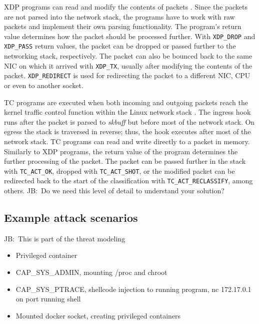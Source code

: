 \documentclass[english, 12pt, a4paper, sci, utf8, a-2b, online]{aaltothesis}
\newcommand{\mycomment}[3]{\textcolor{#1}{#2:~#3}}
\newcommand{\jb}[1]{\noindent\mycomment{aaltoRed}{JB}{#1}}
\begin{document}

XDP programs can read and modify the contents of packets \cite{vieira2020fast}.
Since the packets are not parsed into the network stack, the programs have to work with raw packets and implement their own parsing functionality.
The program's return value determines how the packet should be processed further.
With \texttt{XDP\_DROP} and \texttt{XDP\_PASS} return values, the packet can be dropped or passed further to the networking stack, respectively.
The packet can also be bounced back to the same NIC on which it arrived with \texttt{XDP\_TX}, usually after modifying the contents of the packet.
\texttt{XDP\_REDIRECT} is used for redirecting the packet to a different NIC, CPU or even to another socket.

TC programs are executed when both incoming and outgoing packets reach the kernel traffic control function within the Linux network stack \cite{vieira2020fast}.
The ingress hook runs after the packet is parsed to \emph{skbuff} but before most of the network stack.
On egress the stack is traversed in reverse; thus, the hook executes after most of the network stack.
TC programs can read and write directly to a packet in memory.
Similarly to XDP programs, the return value of the program determines the further processing of the packet.
The packet can be passed further in the stack with \texttt{TC\_ACT\_OK}, dropped with \texttt{TC\_ACT\_SHOT}, or the modified packet can be redirected back to the start of the classification with \texttt{TC\_ACT\_RECLASSIFY}, among others.
\jb{Do we need this level of detail to understand your solution?}

\clearpage
\subsection{Example attack scenarios}
\jb{This is part of the threat modeling}

\begin{itemize}
  \item Privileged container
  \item CAP\_SYS\_ADMIN, mounting /proc and chroot
  \item CAP\_SYS\_PTRACE, shellcode injection to running program, nc 172.17.0.1 on port running shell
  \item Mounted docker socket, creating privileged containers
\end{itemize}
\end{document}
